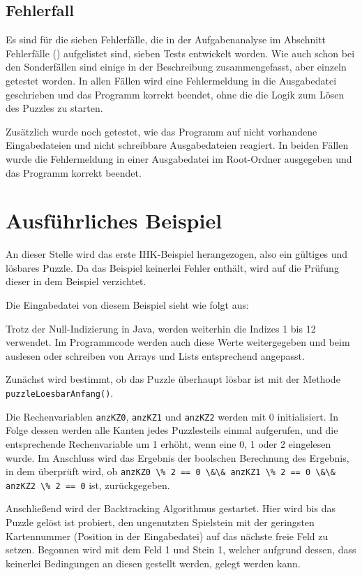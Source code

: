 \subsection{Fehlerfall}
Es sind für die sieben Fehlerfälle, die in der Aufgabenanalyse im Abschnitt Fehlerfälle () aufgelistet sind, sieben Tests entwickelt worden. Wie auch schon bei den Sonderfällen sind einige in der Beschreibung zusammengefasst, aber einzeln getestet worden. In allen Fällen wird eine Fehlermeldung in die Ausgabedatei geschrieben und das Programm korrekt beendet, ohne die die Logik zum Lösen des Puzzles zu starten.

Zusätzlich wurde noch getestet, wie das Programm auf nicht vorhandene Eingabedateien und nicht schreibbare Ausgabedateien reagiert. In beiden Fällen wurde die Fehlermeldung in einer Ausgabedatei im Root-Ordner ausgegeben und das Programm korrekt beendet.

\clearpage
\section{Ausführliches Beispiel}
\label{sec:ausfuehrlichesBsp}
An dieser Stelle wird das erste IHK-Beispiel herangezogen, also ein gültiges und lösbares Puzzle. Da das Beispiel keinerlei Fehler enthält, wird auf die Prüfung dieser in dem Beispiel verzichtet.

Die Eingabedatei von diesem Beispiel sieht wie folgt aus:
%

Trotz der Null-Indizierung in Java, werden weiterhin die Indizes 1 bis 12 verwendet. Im Programmcode werden auch diese Werte weitergegeben und beim auslesen oder schreiben von Arrays und Lists entsprechend angepasst.

Zunächst wird bestimmt, ob das Puzzle überhaupt lösbar ist mit der Methode \lstinline{puzzleLoesbarAnfang()}.

Die Rechenvariablen \lstinline{anzKZ0}, \lstinline{anzKZ1} und \lstinline{anzKZ2} werden mit 0 initialisiert. In Folge dessen werden alle Kanten jedes Puzzlesteils einmal aufgerufen, und die entsprechende Rechenvariable um 1 erhöht, wenn eine 0, 1 oder 2 eingelesen wurde. Im Anschluss wird das Ergebnis der boolschen Berechnung des Ergebnis, in dem überprüft wird, ob \lstinline{anzKZ0 \% 2 == 0 \&\& anzKZ1 \% 2 == 0 \&\& anzKZ2 \% 2 == 0} ist, zurückgegeben.

Anschließend wird der Backtracking Algorithmus gestartet. Hier wird bis das Puzzle gelöst ist probiert, den ungenutzten Spielstein mit der geringsten Kartennummer (Position in der Eingabedatei) auf das nächste freie Feld zu setzen. Begonnen wird mit dem Feld 1 und Stein 1, welcher aufgrund dessen, dass keinerlei Bedingungen an diesen gestellt werden, gelegt werden kann.

